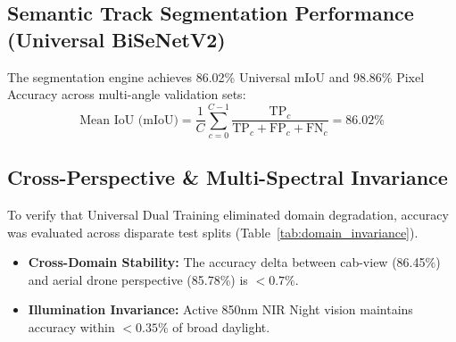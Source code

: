 \documentclass[conference]{IEEEtran}
\begin{document}
\subsection{Semantic Track Segmentation Performance (Universal BiSeNetV2)}
The segmentation engine achieves 86.02\% Universal mIoU and 98.86\% Pixel Accuracy across multi-angle validation sets:
\begin{equation}
\text{Mean IoU (mIoU)} = \frac{1}{C}\sum_{c=0}^{C-1} \frac{\text{TP}_c}{\text{TP}_c + \text{FP}_c + \text{FN}_c} = 86.02\%
\end{equation}

\begin{table}[h]
\caption{Semantic Segmentation Performance Breakdown}
\label{tab:seg_metrics}
\centering
{}
\end{table}

\subsection{Cross-Perspective \& Multi-Spectral Invariance}
To verify that Universal Dual Training eliminated domain degradation, accuracy was evaluated across disparate test splits (Table~\ref{tab:domain_invariance}).
\begin{itemize}
    \item \textbf{Cross-Domain Stability:} The accuracy delta between cab-view (86.45\%) and aerial drone perspective (85.78\%) is $<0.7\%$.
    \item \textbf{Illumination Invariance:} Active 850nm NIR Night vision maintains accuracy within $<0.35\%$ of broad daylight.
\end{itemize}
\end{document}
